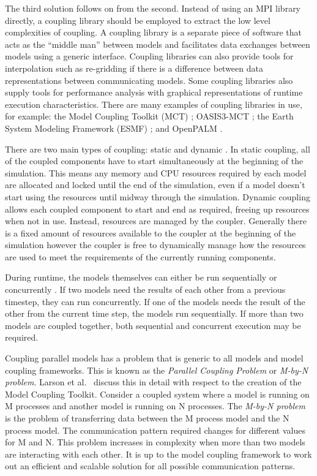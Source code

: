 \documentclass{acm_proc_article-sp}
\renewcommand{\_}{\underscore\hspace{0pt}}
\begin{document}
The third solution \cite{Thevenin} follows on from the second. Instead of using
an MPI library directly, a coupling library should be employed to extract the
low level complexities of coupling. A coupling library is a separate piece of
software that acts as the ``middle man'' between models and facilitates data
exchanges between models using a generic interface. Coupling libraries can also
provide tools for interpolation such as re-gridding if there is a difference
between data representations between communicating models. Some coupling
libraries also supply tools for performance analysis with graphical
representations of runtime execution characteristics. There are many examples of
coupling libraries in use, for example: the Model Coupling Toolkit (MCT)
\cite{Larson2005,Jacob2005}; OASIS3-MCT \cite{Valcke,Valcke2013}; the Earth
System Modeling Framework (ESMF) \cite{Ramework2004}; and OpenPALM
\cite{Piacentini2011}.

There are two main types of coupling: static and dynamic
\cite{Thevenin,Piacentini2011}. In static coupling, all of the coupled
components have to start simultaneously at the beginning of the simulation. This
means any memory and CPU resources required by each model are allocated and
locked until the end of the simulation, even if a model doesn't start using the
resources until midway through the simulation. Dynamic coupling allows each
coupled component to start and end as required, freeing up resources when not in
use. Instead, resources are managed by the coupler. Generally there is a fixed
amount of resources available to the coupler at the beginning of the simulation
however the coupler is free to dynamically manage how the resources are used to
meet the requirements of the currently running components.

During runtime, the models themselves can either be run sequentially or
concurrently \cite{Maisonnave}. If two models need the results of each other
from a previous timestep, they can run concurrently. If one of the models needs
the result of the other from the current time step, the models run sequentially.
If more than two models are coupled together, both sequential and concurrent
execution may be required.

Coupling parallel models has a problem that is generic to all models and model
coupling frameworks. This is known as the \textit{Parallel Coupling Problem} or
\textit{M-by-N problem}. Larson et al.\ \cite{Larson2005,Jacob2005} discuss this
in detail with respect to the creation of the Model Coupling Toolkit. Consider a
coupled system where a model is running on M processes and another model is
running on N processes. The \textit{M-by-N problem} is the problem of
transferring data between the M process model and the N process model. The
communication pattern required changes for different values for M and N. This
problem increases in complexity when more than two models are interacting with
each other. It is up to the model coupling framework to work out an efficient
and scalable solution for all possible communication patterns.
\end{document}
